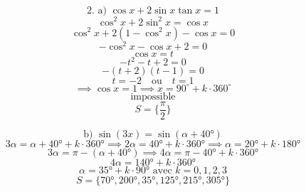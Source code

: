 \documentclass{article}
\begin{document}
\[
    \text{2. a) } \cos x + 2 \sin x \tan x = 1
\]
\[
    \cos^2 x + 2 \sin^2 x = \cos x
\]
\[
    \cos^2 x + 2(1-\cos^2 x) - \cos x = 0
\]
\[
    -\cos^2 x - \cos x + 2 = 0
\]
\[
    \cos x = t
\]
\[
    -t^2 - t + 2 = 0
\]
\[
    -(t+2)(t-1) = 0
\]
\[
    t=-2 \quad \text{ou} \quad t=1
\]
\[
    \implies \cos x = 1 \implies x = 90^\circ + k \cdot 360^\circ
\]
\[
    \text{impossible}
\]
\[
    S = \{\frac{\pi}{2}\}
\]

\[ \text{b) } \sin(3x) = \sin(\alpha+40°) \]
\[ 3\alpha = \alpha + 40° + k \cdot 360° \implies 2\alpha = 40° + k \cdot 360° \implies \alpha = 20° + k \cdot 180° \]
\[ 3\alpha = \pi - (\alpha + 40°) \implies 4\alpha = \pi - 40° + k \cdot 360°\]
\[ 4\alpha = 140° + k \cdot 360° \]
\[ \alpha = 35° + k \cdot 90° \text{ avec } k=0, 1, 2, 3 \]
\[ S = \{70°, 200°, 35°, 125°, 215°, 305°\} \]
\end{document}
